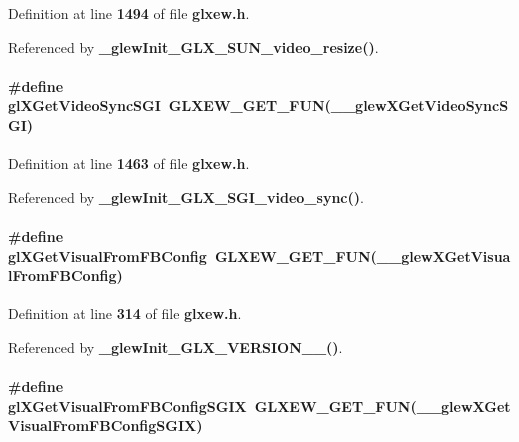 Definition at line {\bf 1494} of file {\bf glxew.\+h}.



Referenced by {\bf \+\_\+glew\+Init\+\_\+\+G\+L\+X\+\_\+\+S\+U\+N\+\_\+video\+\_\+resize()}.

\paragraph[{gl\+X\+Get\+Video\+Sync\+S\+GI}]{\setlength{\rightskip}{0pt plus 5cm}\#define gl\+X\+Get\+Video\+Sync\+S\+GI~{\bf G\+L\+X\+E\+W\+\_\+\+G\+E\+T\+\_\+\+F\+UN}({\bf \+\_\+\+\_\+glew\+X\+Get\+Video\+Sync\+S\+GI})}\label{glxew_8h_a194a598fab5e3118e50e7dbf7909f28d}


Definition at line {\bf 1463} of file {\bf glxew.\+h}.



Referenced by {\bf \+\_\+glew\+Init\+\_\+\+G\+L\+X\+\_\+\+S\+G\+I\+\_\+video\+\_\+sync()}.

\paragraph[{gl\+X\+Get\+Visual\+From\+F\+B\+Config}]{\setlength{\rightskip}{0pt plus 5cm}\#define gl\+X\+Get\+Visual\+From\+F\+B\+Config~{\bf G\+L\+X\+E\+W\+\_\+\+G\+E\+T\+\_\+\+F\+UN}({\bf \+\_\+\+\_\+glew\+X\+Get\+Visual\+From\+F\+B\+Config})}\label{glxew_8h_a88941f4492eacfc24b886eea8afb413f}


Definition at line {\bf 314} of file {\bf glxew.\+h}.



Referenced by {\bf \+\_\+glew\+Init\+\_\+\+G\+L\+X\+\_\+\+V\+E\+R\+S\+I\+O\+N\+\_\+\_()}.

\paragraph[{gl\+X\+Get\+Visual\+From\+F\+B\+Config\+S\+G\+IX}]{\setlength{\rightskip}{0pt plus 5cm}\#define gl\+X\+Get\+Visual\+From\+F\+B\+Config\+S\+G\+IX~{\bf G\+L\+X\+E\+W\+\_\+\+G\+E\+T\+\_\+\+F\+UN}({\bf \+\_\+\+\_\+glew\+X\+Get\+Visual\+From\+F\+B\+Config\+S\+G\+IX})}\label{glxew_8h_a6648aea4e1a0c7cc52d17f0332a5c951}


